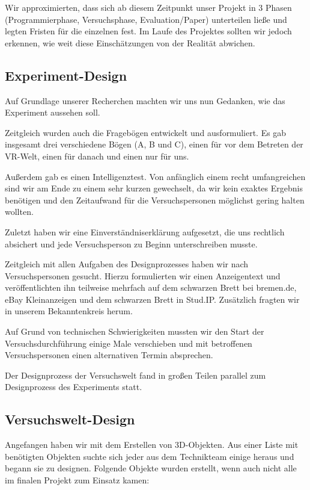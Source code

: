 \documentclass{Bericht}
\begin{document}
		Wir approximierten, dass sich ab diesem Zeitpunkt unser Projekt in 3 Phasen (Programmierphase, Versuchsphase, Evaluation/Paper) unterteilen ließe und legten Fristen für die einzelnen fest. Im Laufe des Projektes sollten wir jedoch erkennen, wie weit diese Einschätzungen von der Realität abwichen.

	\subsection{Experiment-Design} %
		Auf Grundlage unserer Recherchen machten wir uns nun Gedanken, wie das Experiment aussehen soll. 
		
		Zeitgleich wurden auch die Fragebögen entwickelt und ausformuliert. Es gab insgesamt drei verschiedene Bögen (A, B und C), einen für vor dem Betreten der VR-Welt, einen für danach und einen nur für uns.
			
		Außerdem gab es einen Intelligenztest. Von anfänglich einem recht umfangreichen sind wir am Ende zu einem sehr kurzen gewechselt, da wir kein exaktes Ergebnis benötigen und den Zeitaufwand für die Versuchspersonen möglichst gering halten wollten.
			
		Zuletzt haben wir eine Einverständniserklärung aufgesetzt, die uns rechtlich absichert und jede Versuchsperson zu Beginn unterschreiben musste.
			
		Zeitgleich mit allen Aufgaben des Designprozesses haben wir nach Versuchspersonen gesucht. Hierzu formulierten wir einen Anzeigentext und veröffentlichten ihn teilweise mehrfach auf dem schwarzen Brett bei bremen.de, eBay Kleinanzeigen und dem schwarzen Brett in Stud.IP. Zusätzlich fragten wir in unserem Bekanntenkreis herum. 
			
		Auf Grund von technischen Schwierigkeiten mussten wir den Start der Versuchsdurchführung einige Male verschieben und mit betroffenen Versuchspersonen einen alternativen Termin absprechen. 

		Der Designprozess der Versuchswelt fand in großen Teilen parallel zum Designprozess des Experiments statt. 
	
	\subsection{Versuchswelt-Design} %
		Angefangen haben wir mit dem Erstellen von 3D-Objekten. Aus einer Liste mit benötigten Objekten suchte sich jeder aus dem Technikteam einige heraus und begann sie zu designen. Folgende Objekte wurden erstellt, wenn auch nicht alle im finalen Projekt zum Einsatz kamen:
\end{document}
